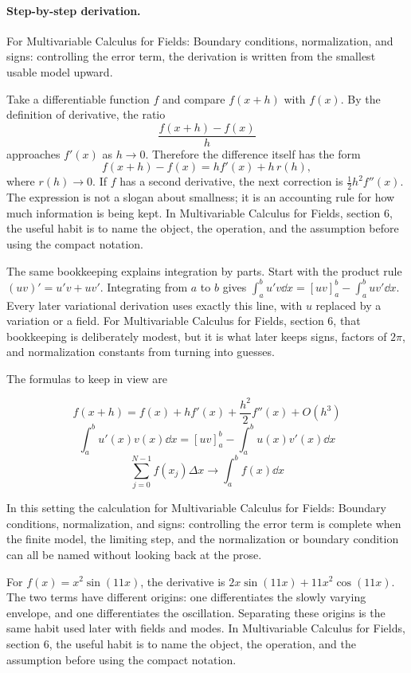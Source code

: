 \paragraph{Step-by-step derivation.}

For Multivariable Calculus for Fields: Boundary conditions, normalization, and signs: controlling the error term, the derivation is written from the smallest usable model upward.

Take a differentiable function \(f\) and compare \(f(x+h)\) with \(f(x)\).  By the definition of derivative, the ratio
\[
  \frac{f(x+h)-f(x)}{h}
\]
approaches \(f'(x)\) as \(h\to0\).  Therefore the difference itself has the form
\[
  f(x+h)-f(x)=hf'(x)+h\,r(h),
\]
where \(r(h)\to0\).  If \(f\) has a second derivative, the next correction is \(\frac12h^2f''(x)\).  The expression is not a slogan about smallness; it is an accounting rule for how much information is being kept.  In Multivariable Calculus for Fields, section 6, the useful habit is to name the object, the operation, and the assumption before using the compact notation.

The same bookkeeping explains integration by parts.  Start with the product rule \((uv)'=u'v+uv'\).  Integrating from \(a\) to \(b\) gives \(\int_a^b u'v\dd x=[uv]_a^b-\int_a^buv'\dd x\).  Every later variational derivation uses exactly this line, with \(u\) replaced by a variation or a field.  For Multivariable Calculus for Fields, section 6, that bookkeeping is deliberately modest, but it is what later keeps signs, factors of \(2\pi\), and normalization constants from turning into guesses.

The formulas to keep in view are

\[
  f(x+h)=f(x)+hf'(x)+\frac{h^2}{2}f''(x)+O(h^3)
\]
\[
  \int_a^b u'(x)v(x)\dd x=[uv]_a^b-\int_a^b u(x)v'(x)\dd x
\]
\[
  \sum_{j=0}^{N-1}f(x_j)\Delta x\longrightarrow \int_a^b f(x)\dd x
\]

In this setting the calculation for Multivariable Calculus for Fields: Boundary conditions, normalization, and signs: controlling the error term is complete when the finite model, the limiting step, and the normalization or boundary condition can all be named without looking back at the prose.




\begin{example}
For \(f(x)=x^2\sin(11x)\), the derivative is \(2x\sin(11x)+11x^2\cos(11x)\).  The two terms have different origins: one differentiates the slowly varying envelope, and one differentiates the oscillation.  Separating these origins is the same habit used later with fields and modes.  In Multivariable Calculus for Fields, section 6, the useful habit is to name the object, the operation, and the assumption before using the compact notation.
\end{example}



